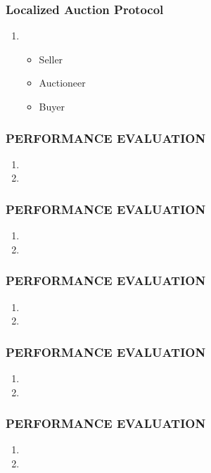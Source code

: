 \documentclass[11pt]{class}
\begin{document}
										\begin{frame}
											\frametitle{Localized Auction Protocol}
											\begin{enumerate}
												\item 
												\begin{itemize}
													\item Seller
													\item Auctioneer
													\item Buyer
												\end{itemize}
												
											\end{enumerate}
										\end{frame}
										\begin{frame}
											\frametitle{PERFORMANCE EVALUATION}
											\begin{enumerate}
												\item 
												\item 
											\end{enumerate}
										\end{frame}
										\begin{frame}
											\frametitle{PERFORMANCE EVALUATION}
											\begin{enumerate}
												\item 
												\item 
											\end{enumerate}
										\end{frame}
										\begin{frame}
											\frametitle{PERFORMANCE EVALUATION}
											\begin{enumerate}
												\item 
												\item 
											\end{enumerate}
										\end{frame}
										\begin{frame}
											\frametitle{PERFORMANCE EVALUATION}
											\begin{enumerate}
												\item 
												\item 
											\end{enumerate}
										\end{frame}
										\begin{frame}
											\frametitle{PERFORMANCE EVALUATION}
											\begin{enumerate}
												\item 
												\item 
											\end{enumerate}
										\end{frame}
										
\end{document}
